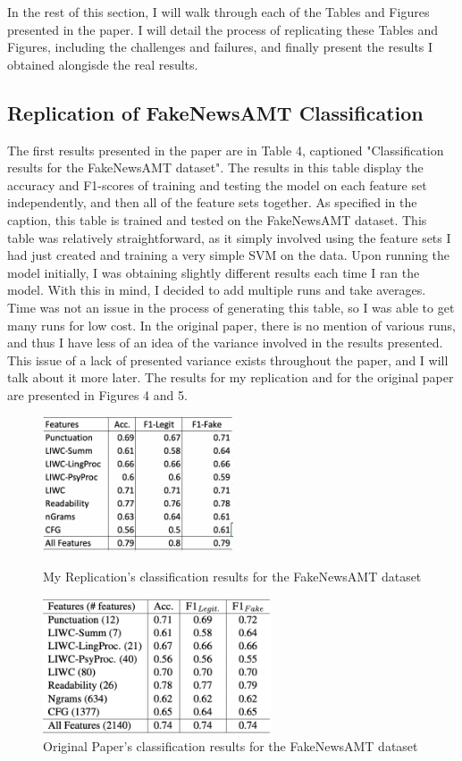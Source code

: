 \documentclass{article}
\begin{document}
In the rest of this section, I will walk through each of the Tables and Figures presented in the paper. I will detail the process of replicating these Tables and Figures, including the challenges and failures, and finally present the results I obtained alongisde the real results.

\subsection{Replication of FakeNewsAMT Classification}

The first results presented in the paper are in Table 4, captioned "Classification results for the FakeNewsAMT dataset". The results in this table display the accuracy and F1-scores of training and testing the model on each feature set independently, and then all of the feature sets together. As specified in the caption, this table is trained and tested on the FakeNewsAMT dataset. This table was relatively straightforward, as it simply involved using the feature sets I had just created and training a very simple SVM on the data. Upon running the model initially, I was obtaining slightly different results each time I ran the model. With this in mind, I decided to add multiple runs and take averages. Time was not an issue in the process of generating this table, so I was able to get many runs for low cost. In the original paper, there is no mention of various runs, and thus I have less of an idea of the variance involved in the results presented. This issue of a lack of presented variance exists throughout the paper, and I will talk about it more later. The results for my replication and for the original paper are presented in Figures 4 and 5.

\begin{figure}[]
  \centering
  \begin{minipage}[b]{0.4\textwidth}
    \includegraphics[height=4cm, width=\textwidth]{Results_For_Paper/Table4Me.png}
    \caption{My Replication's classification results for the FakeNewsAMT dataset}
  \end{minipage}
  \hfill
  \begin{minipage}[b]{0.4\textwidth}
    \includegraphics[height=4cm, width=\textwidth]{Results_For_Paper/Table4Real.png}
    \caption{Original Paper's classification results for the FakeNewsAMT dataset}
  \end{minipage}
\end{figure}
\end{document}
